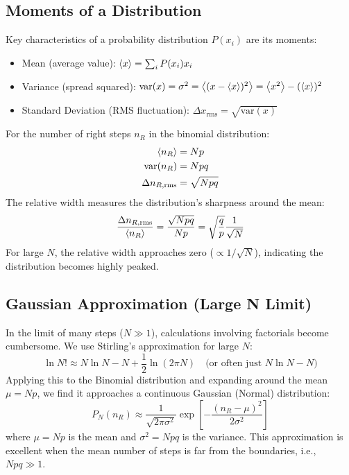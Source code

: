 \documentclass[10pt, letterpaper]{article}
\newcommand{\avg}[1]{\expval{#1}} %
\newcommand{\variance}{\mathrm{var}}
\newcommand{\rmsd}{\Delta} %
\begin{document}
\subsection{Moments of a Distribution}
Key characteristics of a probability distribution $P(x_i)$ are its moments:
\begin{itemize}
    \item Mean (average value): $\avg{x} = \sum_i P(x_i) x_i$
    \item Variance (spread squared): $\variance(x) = \sigma^2 = \avg{(x - \avg{x})^2} = \avg{x^2} - (\avg{x})^2$
    \item Standard Deviation (RMS fluctuation): $\rmsd x_{\mathrm{rms}} = \sqrt{\variance(x)}$
\end{itemize}
For the number of right steps $n_R$ in the binomial distribution:
\begin{align}
    \avg{n_R} &= Np \\
    \variance(n_R) &= Npq \\
    \rmsd n_{R, \mathrm{rms}} &= \sqrt{Npq}
\end{align}
The relative width measures the distribution's sharpness around the mean:
\begin{equation}
    \frac{\rmsd n_{R, \mathrm{rms}}}{\avg{n_R}} = \frac{\sqrt{Npq}}{Np} = \sqrt{\frac{q}{p}} \frac{1}{\sqrt{N}}
\end{equation}
For large $N$, the relative width approaches zero ($\propto 1/\sqrt{N}$), indicating the distribution becomes highly peaked.

\subsection{Gaussian Approximation (Large N Limit)}
In the limit of many steps ($N \gg 1$), calculations involving factorials become cumbersome. We use Stirling's approximation for large $N$:
\begin{equation*}
    \ln N! \approx N \ln N - N + \frac{1}{2} \ln(2 \pi N) \quad \text{(or often just } N \ln N - N\text{)}
\end{equation*}
Applying this to the Binomial distribution and expanding around the mean $\mu = Np$, we find it approaches a continuous Gaussian (Normal) distribution:
\begin{equation}
    P_N(n_R) \approx \frac{1}{\sqrt{2 \pi \sigma^2}} \exp\left[ -\frac{(n_R - \mu)^2}{2 \sigma^2} \right]
\end{equation}
where $\mu = Np$ is the mean and $\sigma^2 = Npq$ is the variance. This approximation is excellent when the mean number of steps is far from the boundaries, i.e., $Npq \gg 1$.
\end{document}
